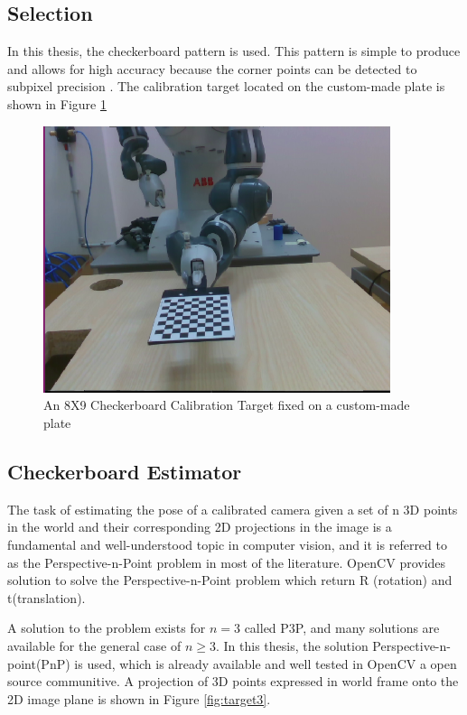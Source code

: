 \subsection{Selection}
In this thesis, the checkerboard pattern is used.  This pattern is simple to produce and allows for high accuracy because the corner points can be detected to subpixel precision \cite{planarTargets}. The calibration target located on the custom-made plate is shown in Figure \ref{fig:target2}


\begin{figure}[!h]
\begin{center}
\includegraphics[width=4in]{figures03/target1.png}
\caption{An 8X9 Checkerboard Calibration Target fixed on a custom-made plate}
\label{fig:target2}
\end{center}
\end{figure}

\subsection{Checkerboard Estimator}

The task of estimating the pose of a calibrated camera given a set of n 3D points in the world and their corresponding 2D projections in the image is a fundamental and well-understood topic in computer vision, and it is referred to as the Perspective-n-Point problem in most of the literature. OpenCV provides solution to solve the Perspective-n-Point problem which return R (rotation) and t(translation).  

A solution to the problem exists for $n = 3$ called P3P, and many solutions are available for the general case of $n\geq 3$. In this thesis, the solution Perspective-n-point(PnP) \cite{pnp} is used, which is already available and well tested in OpenCV a open source communitive. A projection of 3D points expressed in world frame onto the 2D image plane is shown in Figure \ref{fig:target3}.


